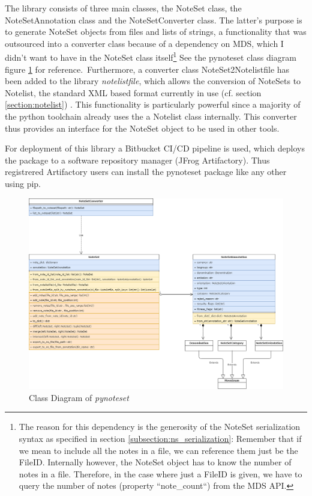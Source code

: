 The library consists of three main classes, the NoteSet class, the NoteSetAnnotation class and the NoteSetConverter class. The latter's purpose is to generate NoteSet objects from files and lists of strings, a functionality that was outsourced into a converter class because of a dependency on MDS, which I didn't want to have in the NoteSet class itself\footnote{The reason for this dependency is the generosity of the NoteSet serialization syntax as specified in section \ref{subsection:ns_serialization}: Remember that if we mean to include all the notes in a file, we can reference them just be the FileID. Internally however, the NoteSet object has to know the number of notes in a file. Therefore, in the case where just a FileID is given, we have to query the number of notes (property ``note\_count``) from the MDS API.} See the pynoteset class diagram figure \ref{fig:pynoteset} for reference.\
Furthermore, a converter class NoteSet2Notelistfile has been added to the library \emph{notelistfile}, which allows the conversion of NoteSets to Notelist, the standard XML based format currently in use (cf. section \ref{section:notelist}) . This functionality is particularly powerful since a majority of the python toolchain already uses the a Notelist class internally. This converter thus provides an interface for the NoteSet object to be used in other tools.\par
For deployment of this library a Bitbucket CI/CD pipeline is used, which deploys the package to a software repository manager (JFrog Artifactory). Thus registrered Artifactory users can install the pynoteset package like any other using pip.
\begin{figure}
 \includegraphics[width=\linewidth]{images/pynoteset.png}
   \caption{Class Diagram of \emph{pynoteset}}\label{fig:pynoteset}
\end{figure}

